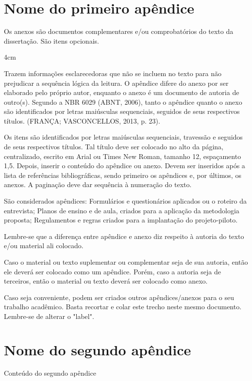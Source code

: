 
\begin{apendicesenv}

\chapter{Nome do primeiro apêndice} %
\label{chap:apendiceA}

Os anexos são documentos complementares e/ou comprobatórios do texto da dissertação. São itens opcionais.

\begin{adjustwidth}{4cm}{}
    \SingleSpacing
    \small
    
    Trazem informações esclarecedoras que não se incluem no texto para não prejudicar a sequência lógica da leitura. O apêndice difere do anexo por ser elaborado pelo próprio autor, enquanto o anexo é um documento de autoria de outro(s). Segundo a NBR 6029 (ABNT, 2006), tanto o apêndice quanto o anexo são identificados por letras maiúsculas sequenciais, seguidos de seus respectivos títulos. (FRANÇA; VASCONCELLOS, 2013, p. 23).
    
    \vspace{0.4cm}
\end{adjustwidth}

Os itens são identificados por letras maiúsculas sequenciais, travessão e seguidos de seus respectivos títulos. Tal título deve ser colocado no alto da página, centralizado, escrito em Arial ou Times New Roman, tamanho 12, espaçamento 1,5. Depois, inserir o conteúdo do apêndice ou anexo. Devem ser inseridos após a lista de referências bibliográficas, sendo primeiro os apêndices e, por últimos, os anexos. A paginação deve dar sequência à numeração do texto.

São considerados apêndices: Formulários e questionários aplicados ou o roteiro da entrevista; Planos de ensino e de aula, criados para a aplicação da metodologia proposta; Regulamentos e regras criados para a implantação do projeto-piloto.

Lembre-se que a diferença entre apêndice e anexo diz respeito à autoria do texto e/ou material ali colocado.

Caso o material ou texto suplementar ou complementar seja de sua autoria, então ele deverá ser colocado como um apêndice. Porém, caso a autoria seja de terceiros, então o material ou texto deverá ser colocado como anexo.

Caso seja conveniente, podem ser criados outros apêndices/anexos para o seu trabalho acadêmico. Basta recortar e colar este trecho neste mesmo documento. Lembre-se de alterar o "label".

\chapter{Nome do segundo apêndice}
\label{chap:apendiceB}

Conteúdo do segundo apêndice

\end{apendicesenv}
